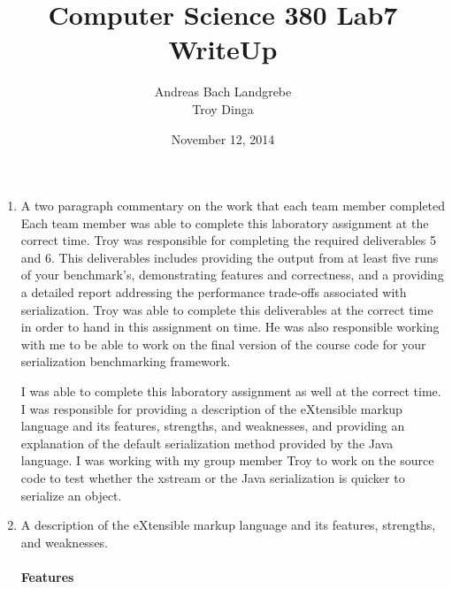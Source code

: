 \documentclass{article}
\title{Computer Science 380 Lab7 WriteUp}
\author{Andreas Bach Landgrebe \\ Troy Dinga}
\date{November 12, 2014}
\begin{document}
\begin{enumerate}
\item A two paragraph commentary on the work that each team member completed
\\
Each team member was able to complete this laboratory assignment at the correct time. Troy was responsible for completing the required deliverables 5 and 6. This deliverables includes providing the output from at least five runs of your benchmark's, demonstrating features and correctness, and a providing a detailed report addressing the performance trade-offs associated with serialization. Troy was able to complete this deliverables at the correct time in order to hand in this assignment on time. He was also responsible working with me to be able to work on the final version of the course code for your serialization benchmarking framework. 
\par
I was able to complete this laboratory assignment as well at the correct time. I was responsible for providing a description of the eXtensible markup language and its features, strengths, and weaknesses, and providing an explanation of the default serialization method provided by the Java language. I was working with my group member Troy to work on the source code to test whether the xstream or the Java serialization is quicker to serialize an object. 
\newpage
\item {A description of the eXtensible markup language and its features, strengths, and weaknesses.}
\\
\\
\textbf{Features}


\end{enumerate}
\end{document}
